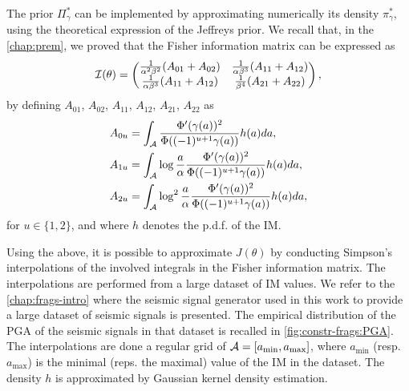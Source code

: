 The prior $\varPi_\gamma^\ast$ can be implemented by approximating numerically its density $\pi^\ast_\gamma$, using the theoretical expression of the Jeffreys prior.
We recall that, in the \cref{chap:prem}, we proved that %
the Fisher information matrix can be expressed as 
\begin{equation}
        \mathcal{I}(\theta)=\begin{pmatrix}
        \frac{1}{\alpha^2\beta^2}(A_{01} + A_{02}) & \frac{1}{\alpha\beta^3}(A_{11}+A_{12}) \\
        \frac{1}{\alpha\beta^3}(A_{11}+A_{12}) & \frac{1}{\beta^4}(A_{21}+A_{22})
    \end{pmatrix},
    \end{equation}
by defining 
$A_{01}$, $A_{02}$, $A_{11}$, $A_{12}$, $A_{21}$, $A_{22}$ as
    \begin{equation} %
    \begin{aligned}
        A_{0u} &= \int_\cA\frac{\Phi'(\gamma(a))^2}{\Phi((-1)^{u+1}\gamma(a))}h(a)da,\\
        A_{1u} &= \int_\cA\log\frac{a}{\alpha}\frac{\Phi'(\gamma(a))^2}{\Phi((-1)^{u+1}\gamma(a))}h(a)da,\\
        A_{2u} &= \int_\cA\log^2\frac{a}{\alpha}\frac{\Phi'(\gamma(a))^2}{\Phi((-1)^{u+1}\gamma(a))}h(a)da,
    \end{aligned}
    \end{equation}
for $u\in\{1,2\}$, and where $h$ denotes the p.d.f. of the IM.

Using the above, it is possible to approximate $J(\theta)$ by conducting Simpson's interpolations of the involved integrals in the Fisher information matrix. The interpolations are performed from a large dataset of IM values. We refer to the \cref{chap:frags-intro} where the seismic signal generator used in this work to provide
a large dataset of seismic signals is presented. The empirical distribution of the PGA of the seismic signals in that dataset is recalled in \cref{fig:constr-frags:PGA}. %
The interpolations are done a regular grid of $\mathcal{A}=[a_{\min},a_{\max}]$, where $a_{\min}$ (resp. $a_{\max}$) is the minimal (reps. the maximal) value of the IM in the dataset.
The density $h$ is approximated by Gaussian kernel density estimation. 

